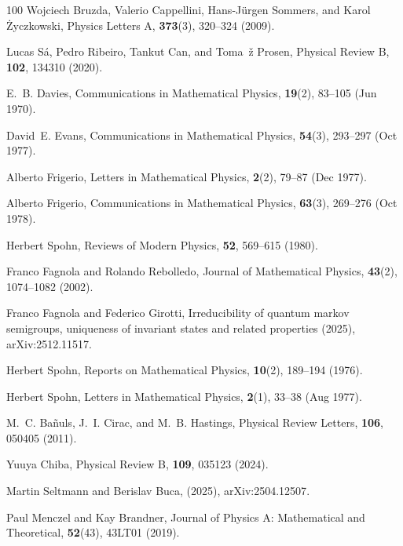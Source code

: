 \documentclass[preprint,pteplogo]{ptephy_v2}%
\numberwithin{equation}{section}
\theoremstyle{definition}
\begin{document}
\begin{thebibliography}{100}
Wojciech Bruzda, Valerio Cappellini, Hans-Jürgen Sommers, and Karol Życzkowski, Physics Letters A, {\bf 373}(3), 320--324 (2009).

Lucas S\'a, Pedro Ribeiro, Tankut Can, and Toma\ifmmode {}\else~\v{z}\fi{} Prosen, Physical Review B, {\bf 102}, 134310 (2020).

E.~B. Davies, Communications in Mathematical Physics, {\bf 19}(2), 83--105 (Jun 1970).

David~E. Evans, Communications in Mathematical Physics, {\bf 54}(3), 293--297 (Oct 1977).

Alberto Frigerio, Letters in Mathematical Physics, {\bf 2}(2), 79--87 (Dec 1977).

Alberto Frigerio, Communications in Mathematical Physics, {\bf 63}(3), 269--276 (Oct 1978).

Herbert Spohn, Reviews of Modern Physics, {\bf 52}, 569--615 (1980).

Franco Fagnola and Rolando Rebolledo, Journal of Mathematical Physics, {\bf 43}(2), 1074--1082 (2002).

Franco Fagnola and Federico Girotti,
\newblock Irreducibility of quantum markov semigroups, uniqueness of invariant states and related properties (2025),  {{arXiv:2512.11517}}.

Herbert Spohn, Reports on Mathematical Physics, {\bf 10}(2), 189--194 (1976).

Herbert Spohn, Letters in Mathematical Physics, {\bf 2}(1), 33--38 (Aug 1977).

M.~C. Ba\~nuls, J.~I. Cirac, and M.~B. Hastings, Physical Review Letters, {\bf 106}, 050405 (2011).

Yuuya Chiba, Physical Review B, {\bf 109}, 035123 (2024).

Martin Seltmann and Berislav Buca,
 (2025),  {{arXiv:2504.12507}}.

Paul Menczel and Kay Brandner, Journal of Physics A: Mathematical and Theoretical, {\bf 52}(43), 43LT01 (2019).


\end{thebibliography}
\end{document}
